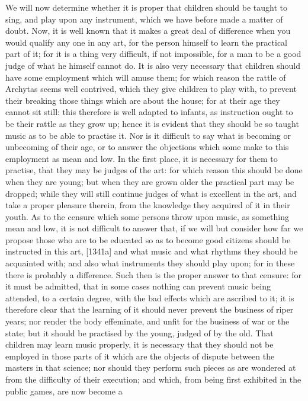 We will now determine whether it is proper that children should be taught
to sing, and play upon any instrument, which we have before made a matter
of doubt. Now, it is well known that it makes a great deal of difference
when you would qualify any one in any art, for the person himself to learn
the practical part of it; for it is a thing very difficult, if not
impossible, for a man to be a good judge of what he himself cannot do. It
is also very necessary that children should have some employment which
will amuse them; for which reason the rattle of Archytas seems well
contrived, which they give children to play with, to prevent their
breaking those things which are about the house; for at their age they
cannot sit still: this therefore is well adapted to infants, as
instruction ought to be their rattle as they grow up; hence it is evident
that they should be so taught music as to be able to practise it. Nor is
it difficult to say what is becoming or unbecoming of their age, or to
answer the objections which some make to this employment as mean and low.
In the first place, it is necessary for them to practise, that they may be
judges of the art: for which reason this should be done when they are
young; but when they are grown older the practical part may be dropped;
while they will still continue judges of what is excellent in the art, and
take a proper pleasure therein, from the knowledge they acquired of it in
their youth. As to the censure which some persons throw upon music, as
something mean and low, it is not difficult to answer that, if we will but
consider how far we propose those who are to be educated so as to become
good citizens should be instructed in this art, [1341a] and what music and
what rhythms they should be acquainted with; and also what instruments
they should play upon; for in these there is probably a difference. Such
then is the proper answer to that censure: for it must be admitted, that
in some cases nothing can prevent music being attended, to a certain
degree, with the bad effects which are ascribed to it; it is therefore
clear that the learning of it should never prevent the business of riper
years; nor render the body effeminate, and unfit for the business of war
or the state; but it should be practised by the young, judged of by the
old. That children may learn music properly, it is necessary that they
should not be employed in those parts of it which are the objects of
dispute between the masters in that science; nor should they perform such
pieces as are wondered at from the difficulty of their execution; and
which, from being first exhibited in the public games, are now become a
